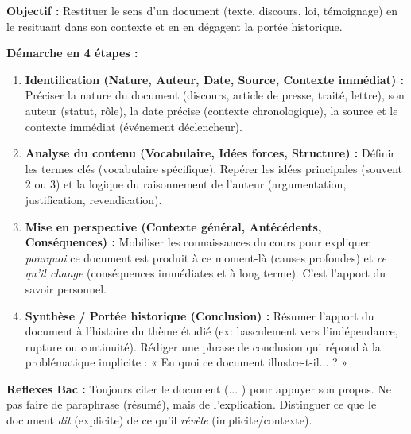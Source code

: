 \documentclass[11pt]{article}
\newcommand{\cle}[1]{{\popxbold\color{popdark}#1}}
\begin{document}
\begin{methode}
\textbf{Objectif :} Restituer le sens d'un document (texte, discours, loi, témoignage) en le resituant dans son contexte et en en dégagent la portée historique.
\par \textbf{Démarche en 4 étapes :}
\begin{enumerate}
    \item \textbf{Identification (Nature, Auteur, Date, Source, Contexte immédiat) :} Préciser la nature du document (discours, article de presse, traité, lettre), son auteur (statut, rôle), la date précise (contexte chronologique), la source et le contexte immédiat (événement déclencheur).
    \item \textbf{Analyse du contenu (Vocabulaire, Idées forces, Structure) :} Définir les termes clés (\cle{vocabulaire spécifique}). Repérer les idées principales (souvent 2 ou 3) et la logique du raisonnement de l'auteur (argumentation, justification, revendication).
    \item \textbf{Mise en perspective (Contexte général, Antécédents, Conséquences) :} Mobiliser les connaissances du cours pour expliquer \emph{pourquoi} ce document est produit à ce moment-là (causes profondes) et \emph{ce qu'il change} (conséquences immédiates et à long terme). C'est l'apport du savoir personnel.
    \item \textbf{Synthèse / Portée historique (Conclusion) :} Résumer l'apport du document à l'histoire du thème étudié (ex: basculement vers l'indépendance, rupture ou continuité). Rédiger une phrase de conclusion qui répond à la problématique implicite : « En quoi ce document illustre-t-il... ? »
\end{enumerate}
\par \textbf{Reflexes Bac :} Toujours citer le document (\guillemotleft ... \guillemotright) pour appuyer son propos. Ne pas faire de paraphrase (résumé), mais de l'explication. Distinguer ce que le document \emph{dit} (explicite) de ce qu'il \emph{révèle} (implicite/contexte).
\end{methode}
\end{document}
